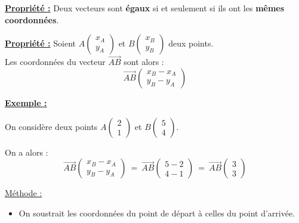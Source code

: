 \documentclass[12pt]{article}
\newcommand*{\Coord}[2]{%
  \ensuremath{
    \begin{pmatrix} 
      #1\\ 
      #2 
    \end{pmatrix}}}
\begin{document}
\vspace{10pt}

\begin{mdframed}[
    linewidth=1pt,
    roundcorner=5pt,
    linecolor=Red,
    innertopmargin=10pt,
    innerbottommargin=10pt
]
{\color{Red}\textbf{\underline{Propriété :}}}
Deux vecteurs sont \textbf{égaux} si et seulement si ils ont les \textbf{mêmes coordonnées}.
\end{mdframed}

\vspace{10pt}

\begin{mdframed}[
    linewidth=1pt,
    roundcorner=5pt,
    linecolor=Red,
    innertopmargin=10pt,
    innerbottommargin=10pt
]
{\color{Red}\textbf{\underline{Propriété :}}}
Soient $A\Coord{x_A}{y_A}$ et $B\Coord{x_B}{y_B}$ deux points. 
\vspace{5pt}
\\Les coordonnées du vecteur $\overrightarrow{AB}$ sont alors :
\[
\overrightarrow{AB}\Coord{x_B - x_A}{y_B - y_A}
\]
\end{mdframed}

\vspace{10pt}

\underline{\textbf{Exemple :}}

\vspace{10pt}
On considère deux points $A\Coord{2}{1}$ et $B\Coord{5}{4}$.

\vspace{5pt}
On a alors : 
\[
\overrightarrow{AB}\Coord{x_B - x_A}{y_B - y_A} \ = \ \overrightarrow{AB} \Coord{5-2}{4-1} \  = \  \overrightarrow{AB}\Coord{3}{3}
\]


\underline{Méthode :}
\vspace{5pt}
\begin{itemize}
    \item On soustrait les coordonnées du point de départ à celles du point d’arrivée.
\end{itemize}


\newpage
\end{document}
